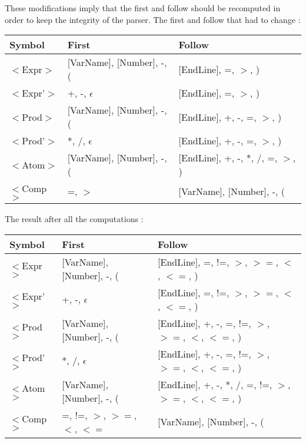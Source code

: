 \documentclass{article}
\begin{document}
These modifications imply that the first and follow should be recomputed in order to keep the integrity of the parser. The first and follow that had to change :

\begin{center}
\begin{tabular}{|m{3cm}|m{5cm}|m{7cm}|} 
\hline

Symbol & First & Follow \\
\hline\hline
$<$Expr$>$ & [VarName], [Number], -, ( & [EndLine], =, $>$, ) \\
\hline
$<$Expr'$>$ & +, -, $\epsilon$ & [EndLine], =, $>$, ) \\
\hline
$<$Prod$>$ & [VarName], [Number], -, ( & [EndLine], +, -, =, $>$, ) \\
\hline
$<$Prod'$>$ & *, /, $\epsilon$ & [EndLine], +, -, =, $>$, ) \\
\hline
$<$Atom$>$ & [VarName], [Number], -, ( & [EndLine], +, -, *, /, =, $>$, ) \\
\hline
$<$Comp$>$ & =, $>$ & [VarName], [Number], -, ( \\
\hline

\end{tabular}
\end{center}

The result after all the computations :

\begin{center}
\begin{tabular}{|m{3cm}|m{5cm}|m{7cm}|} 
\hline

Symbol & First & Follow \\
\hline\hline
$<$Expr$>$ & [VarName], [Number], -, ( & [EndLine], =, !=, $>$, $>=$, $<$, $<=$, ) \\
\hline
$<$Expr'$>$ & +, -, $\epsilon$ & [EndLine], =, !=, $>$, $>=$, $<$, $<=$, ) \\
\hline
$<$Prod$>$ & [VarName], [Number], -, ( & [EndLine], +, -, =, !=, $>$, $>=$, $<$, $<=$, ) \\
\hline
$<$Prod'$>$ & *, /, $\epsilon$ & [EndLine], +, -, =, !=, $>$, $>=$, $<$, $<=$, ) \\
\hline
$<$Atom$>$ & [VarName], [Number], -, ( & [EndLine], +, -, *, /, =, !=, $>$, $>=$, $<$, $<=$, ) \\
\hline
$<$Comp$>$ & =, !=, $>$, $>=$, $<$, $<=$ & [VarName], [Number], -, ( \\
\hline

\end{tabular}
\end{center}
\end{document}
